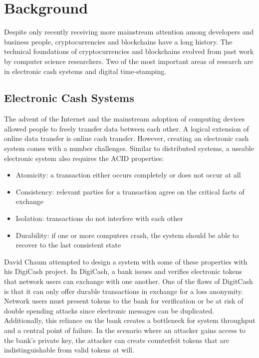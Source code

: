 \section{Background}

Despite only recently receiving more mainstream attention among developers and business
people, cryptocurrencies and blockchains have a long history. The technical
foundations of cryptocurrencies and blockchains evolved from past work by
computer science researchers. Two of the most important areas of research are in
electronic cash systems and digital time-stamping.

\subsection{Electronic Cash Systems}

The advent of the Internet and the mainstream adoption of computing devices
allowed people to freely transfer data between each other. A logical extension
of online data transfer is online cash transfer. However, creating an electronic
cash system comes with a number challenges. Similar to distributed systems, a useable
electronic system also requires the ACID properties\cite{camp1995}:

\begin{itemize}
  \item Atomicity: a transaction either occurs completely or does not occur at all
  \item Consistency: relevant parties for a transaction agree on the critical
    facts of exchange
  \item Isolation: transactions do not interfere with each other
  \item Durability: if one or more computers crash, the system should be able to
    recover to the last consistent state
\end{itemize}

David Chaum attempted to design a system with some of these properties with his
DigiCash project. In DigiCash, a bank issues and verifies electronic tokens that network
users can exchange with one another\cite{camp1995}. One of the flaws of
DigitCash is that it can only offer durable transactions in exchange for a loss
anonymity. Network users must present tokens to the bank for verification or be
at risk of double spending attacks since electronic messages can be duplicated.
Additionally, this reliance on the bank creates a bottleneck for system
throughput and a central point of failure. In the scenario where an attacker
gains access to the bank's private key, the attacker can create counterfeit
tokens that are indistinguishable from valid tokens at will.

